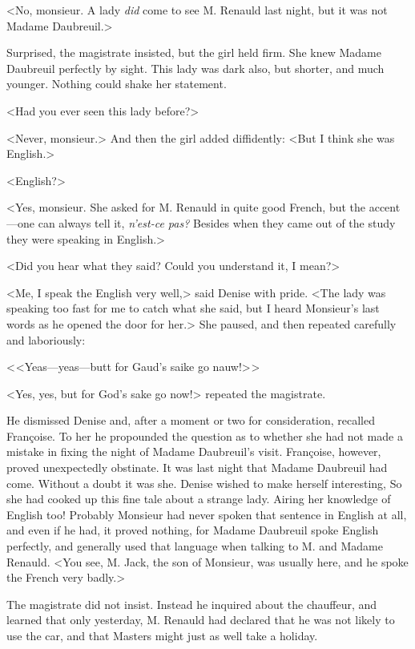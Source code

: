  <No, monsieur. A lady \emph{did} come to see M. Renauld last night, but it was not Madame Daubreuil.> 

 Surprised, the magistrate insisted, but the girl held firm. She knew Madame Daubreuil perfectly by sight. This lady was dark also, but shorter, and much younger. Nothing could shake her statement. 

 <Had you ever seen this lady before?> 

 <Never, monsieur.> And then the girl added diffidently: <But I think she was English.> 

 <English?> 

 <Yes, monsieur. She asked for M. Renauld in quite good French, but the accent—one can always tell it, \emph{n'est-ce pas?} Besides when they came out of the study they were speaking in English.> 

 <Did you hear what they said? Could you understand it, I mean?> 

 <Me, I speak the English very well,> said Denise with pride. <The lady was speaking too fast for me to catch what she said, but I heard Monsieur's last words as he opened the door for her.> She paused, and then repeated carefully and laboriously: 

 < <Yeas—yeas—butt for Gaud's saike go nauw!> > 

 <Yes, yes, but for God's sake go now!> repeated the magistrate. 

 He dismissed Denise and, after a moment or two for consideration, recalled Françoise. To her he propounded the question as to whether she had not made a mistake in fixing the night of Madame Daubreuil's visit. Françoise, however, proved unexpectedly obstinate. It was last night that Madame Daubreuil had come. Without a doubt it was she. Denise wished to make herself interesting,  So she had cooked up this fine tale about a strange lady. Airing her knowledge of English too! Probably Monsieur had never spoken that sentence in English at all, and even if he had, it proved nothing, for Madame Daubreuil spoke English perfectly, and generally used that language when talking to M. and Madame Renauld. <You see, M. Jack, the son of Monsieur, was usually here, and he spoke the French very badly.> 

 The magistrate did not insist. Instead he inquired about the chauffeur, and learned that only yesterday, M. Renauld had declared that he was not likely to use the car, and that Masters might just as well take a holiday. 

